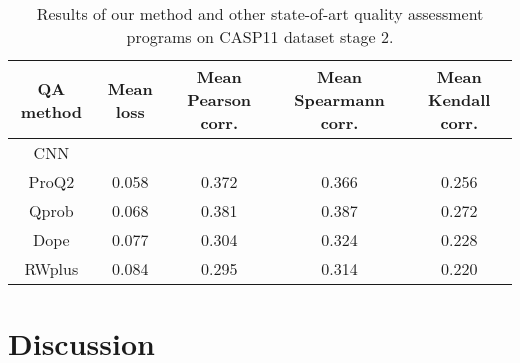 \documentclass[a4paper,10pt]{article}
\begin{document}
\begin{table}[H]
\begin{center}
\begin{tabular}{ c | c | c | c | c }
    
    QA method & Mean loss & Mean Pearson corr. & Mean Spearmann corr. & Mean Kendall corr. \\
    \hline
    CNN     & & & & \\ \hline
    ProQ2   &0.058 &0.372 &0.366 &0.256 \\ \hline
    Qprob   &0.068 &0.381 &0.387 &0.272 \\ \hline
    Dope    &0.077 &0.304 &0.324 &0.228 \\ \hline
    RWplus  &0.084 &0.295 &0.314 &0.220 \\ \hline
\end{tabular}
    
    \caption {Results of our method and other state-of-art quality assessment programs on CASP11 dataset stage 2.}
    \label{Tbl:optParams}
\end{center}
\end{table}


\section{Discussion}

{}

\end{document}
